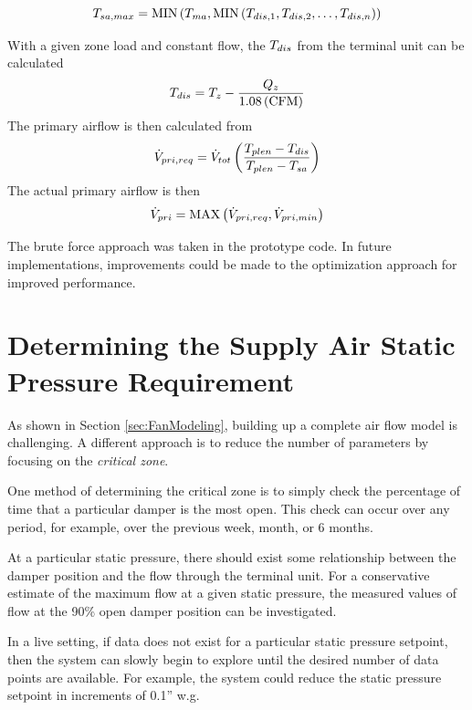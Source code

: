 \begin{equation}
    T_{sa,max} = \text{MIN}\left(T_{ma}, \text{MIN}\left(T_{dis,1}, T_{dis,2}, \ldots, T_{dis,n} \right) \right)
\end{equation}

With a given zone load and constant flow, the \(T_{dis}\) from the terminal
unit can be calculated
\begin{equation}
    T_{dis} = T_{z} -  \frac{Q_{z}}{1.08 \left( \text{CFM} \right)   }
\end{equation}
The primary airflow is then calculated from
\begin{equation}
    \dot{V}_{pri, req} = \dot{V}_{tot} \left( \frac{T_{plen} - T_{dis} }{T_{plen} - T_{sa}} \right)
\end{equation}
The actual primary airflow is then
\begin{equation}
    \dot{V}_{pri} = \text{MAX}\left(\dot{V}_{pri, req}, \dot{V}_{pri, min}  \right)
\end{equation}

The brute force approach was taken in the prototype code. In future implementations,
improvements could be made to the optimization approach for improved
performance.

\section{Determining the Supply Air Static Pressure Requirement}

As shown in Section \ref{sec:FanModeling}, building up a complete air
flow model is challenging. A different approach is to reduce the number
of parameters by focusing on the \textit{critical zone}.

One method of determining the critical zone is to simply check the
percentage of time that a particular damper is the most open. This check
can occur over any period, for example, over the previous week, month,
or 6 months.

At a particular static pressure, there should exist some relationship
between the damper position and the flow through the terminal unit. For
a conservative estimate of the maximum flow at a given static pressure,
the measured values of flow at the 90\% open damper position can be
investigated.

In a live setting, if data does not exist for a particular static
pressure setpoint, then the system can slowly begin to explore until the
desired number of data points are available. For example, the system
could reduce the static pressure setpoint in increments of 0.1'' w.g.




%
%
%
%
%
%
%
%


